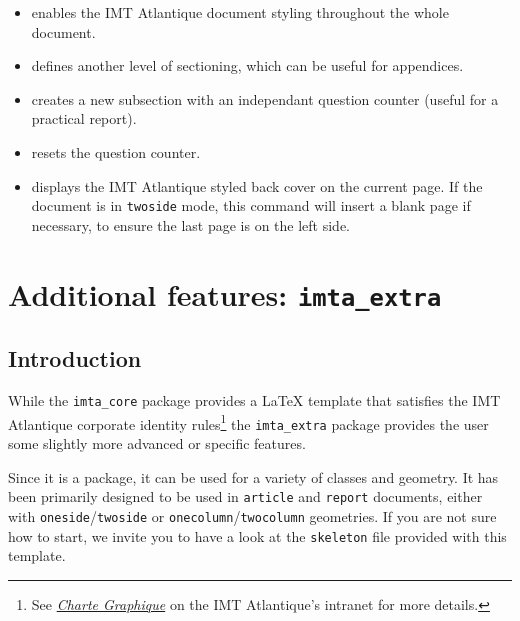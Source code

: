 \documentclass{report}
\begin{document}
\begin{itemize}
    \item {} enables the IMT Atlantique document styling throughout the whole document.
    
    \item {} defines another level of sectioning, which can be useful for appendices.
    
    \item {} creates a new subsection with an independant question counter (useful for a practical report).
    
    \item {} resets the question counter.
    
    \item {} displays the IMT Atlantique styled back cover on the current page. 
    If the document is in \texttt{twoside} mode, this command will insert a blank page if necessary, to ensure the last page is on the left side.
\end{itemize}





\chapter{Additional features: \texttt{imta\_extra}}


\section{Introduction}
While the \texttt{imta\_core} package provides a \LaTeX{} template that satisfies the IMT Atlantique corporate identity rules\footnote{See \textit{\href{https://intranet.imt-atlantique.fr/wp-content/uploads/2017/01/imt_atlantique_chartegraphique.pdf}{Charte Graphique}} on the IMT Atlantique's intranet for more details.} the \texttt{imta\_extra} package provides the user some slightly more advanced or specific features.

Since it is a package, it can be used for a variety of classes and geometry. It has been primarily designed to be used in \texttt{article} and \texttt{report} documents, either with \texttt{oneside}/\texttt{twoside} or \texttt{onecolumn}/\texttt{twocolumn} geometries.
If you are not sure how to start, we invite you to have a look at the \texttt{skeleton} file provided with this template.
\end{document}
